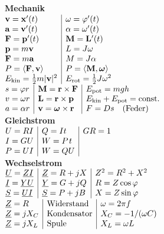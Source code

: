 \documentclass[a4paper,10pt,fleqn,twoside,twocolumn,dvipdfmx]{scrartcl}
\newcommand{\strong}[1]{\textsf{\textbf{#1}}}
\newcommand{\bvec}[1]{\mathbf{#1}}
\newcommand{\bvecgreek}[1]{\boldsymbol{#1}}
\begin{document}
\clearpage

\noindent\strong{Mechanik}\\
$\begin{array}{@{}l|l}
\bvec v = \bvec x'(t) & \omega = \varphi'(t)\\
\bvec a = \bvec v'(t) & \alpha = \omega'(t)\\
\bvec F = \bvec p'(t) & \bvec M = \bvec L'(t)\\
\bvec p = m\bvec v & L = J\omega\\
\bvec F = m\bvec a & M = J\alpha\\
P = \langle\bvec F,\bvec v\rangle & P = \langle\bvec M,\bvecgreek\omega\rangle\\
E_\mathrm{kin} = \frac{1}{2}m|\bvec v|^2
& E_\mathrm{rot} = \frac{1}{2}J\omega^2
\end{array}$\\[2pt]
$\begin{array}{@{}l|l|l}
s =\varphi r
& \bvec M = \bvec r\times\bvec F & E_\mathrm{pot} = mgh\\
v = \omega r
& \bvec L = \bvec r\times\bvec p
& E_\mathrm{kin}+E_\mathrm{pot} = \mathrm{const.}\\
a =\alpha r & \bvec v = \bvecgreek\omega\times\bvec r
& F = Ds\quad \mathrm{(Feder)}
\end{array}$\\[4pt]
\strong{Gleichstrom}\\
$\begin{array}{@{}l|l|l}
U = RI & Q = It & GR = 1\\
I = GU & W = P\;\!t\\
P = UI & W = QU\\
\end{array}$\\[4pt]
\strong{Wechselstrom}\\[2pt]
$\begin{array}{@{}l|l|l}
\underline U = \underline Z\underline I
& \underline Z = R+jX
& Z^2 = R^2+X^2\\
\underline I=\underline Y\underline U
& \underline Y = G+jQ
& R = Z\cos\varphi\\
\underline S = \underline U\underline I
& \underline S = P+jB
& X = Z\sin\varphi
\end{array}$\\[4pt]
$\begin{array}{@{}l|l|l}
\underline Z = R & \mathrm{Widerstand}
& \omega = 2\pi f\\
\underline Z = jX_C & \mathrm{Kondensator}
& X_C = -1/(\omega C)\\
\underline Z = jX_L & \mathrm{Spule}
& X_L = \omega L
\end{array}$\\[4pt]
\end{document}

